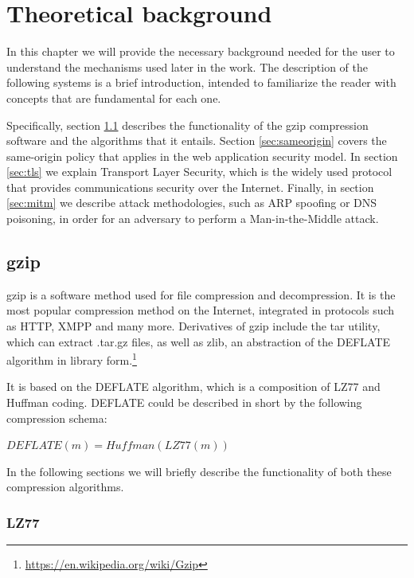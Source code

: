 \chapter{Theoretical background}\label{background}

In this chapter we will provide the necessary background needed for the user to
understand the mechanisms used later in the work. The description of the
following systems is a brief introduction, intended to familiarize the reader
with concepts that are fundamental for each one.

Specifically, section \ref{sec:gzip} describes the functionality of the gzip
compression software and the algorithms that it entails. Section
\ref{sec:sameorigin} covers the same-origin policy that applies in the web
application security model. In section \ref{sec:tls} we explain Transport
Layer Security, which is the widely used protocol that provides communications
security over the Internet. Finally, in section \ref{sec:mitm} we describe
attack methodologies, such as ARP spoofing or DNS poisoning, in order for an
adversary to perform a Man-in-the-Middle attack.

\section{gzip}\label{sec:gzip}

gzip is a software method used for file compression and decompression. It is the
most popular compression method on the Internet, integrated in protocols such as
HTTP, XMPP and many more. Derivatives of gzip include the tar utility, which can
extract .tar.gz files, as well as zlib, an abstraction of the DEFLATE algorithm
in library form.\footnote{\url{https://en.wikipedia.org/wiki/Gzip}}

It is based on the DEFLATE algorithm, which is a composition of LZ77 and Huffman
coding. DEFLATE could be described in short by the following compression schema:

\begin{math}DEFLATE(m) = Huffman(LZ77(m))\end{math}

In the following sections we will briefly describe the functionality of both
these compression algorithms.

\subsection{LZ77}\label{subsec:lz77}

